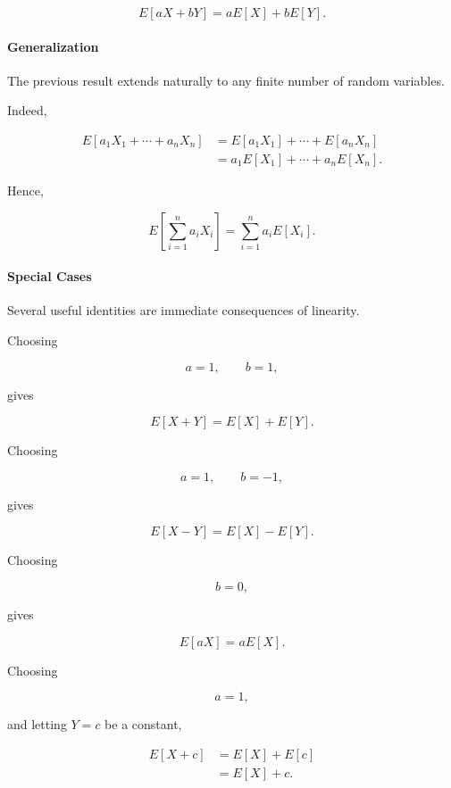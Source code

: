 \documentclass[11pt]{article}
\begin{document}
\begin{mdframed}[
		linewidth=0.8pt,
		roundcorner=6pt,
		backgroundcolor=gray!5,
		linecolor=gray!60,
		innertopmargin=10pt,
		innerbottommargin=10pt,
		innerleftmargin=10pt,
		innerrightmargin=10pt
		]
		\[
		E[aX+bY]
		=
		aE[X]
		+
		bE[Y].
		\]
		
		\bigskip
		
		\paragraph{Generalization}
		
		The previous result extends naturally to any finite number of random
		variables.
		
		Indeed,
		
		\[
		\begin{aligned}
			E[a_1X_1+\cdots+a_nX_n]
			&=
			E[a_1X_1]
			+
			\cdots
			+
			E[a_nX_n]
			\\[0.3cm]
			&=
			a_1E[X_1]
			+\cdots+
			a_nE[X_n].
		\end{aligned}
		\]
		
		Hence,
		
		\[
		\boxed{
			E\!\left[
			\sum_{i=1}^{n}
			a_iX_i
			\right]
			=
			\sum_{i=1}^{n}
			a_iE[X_i].
		}
		\]
		
		\bigskip
		
		\paragraph{Special Cases}
		
		Several useful identities are immediate consequences of linearity.
		
		Choosing
		
		\[
		a=1,
		\qquad
		b=1,
		\]
		
		gives
		
		\[
		\boxed{
			E[X+Y]
			=
			E[X]
			+
			E[Y].
		}
		\]
		
		Choosing
		
		\[
		a=1,
		\qquad
		b=-1,
		\]
		
		gives
		
		\[
		\boxed{
			E[X-Y]
			=
			E[X]
			-
			E[Y].
		}
		\]
		
		Choosing
		
		\[
		b=0,
		\]
		
		gives
		
		\[
		\boxed{
			E[aX]
			=
			aE[X].
		}
		\]
		
		Choosing
		
		\[
		a=1,
		\]
		
		and letting \(Y=c\) be a constant,
		
		\[
		\begin{aligned}
			E[X+c]
			&=
			E[X]
			+
			E[c]
			\\[0.3cm]
			&=
			E[X]
			+
			c.
		\end{aligned}
		\]
		

\end{mdframed}
\end{document}

